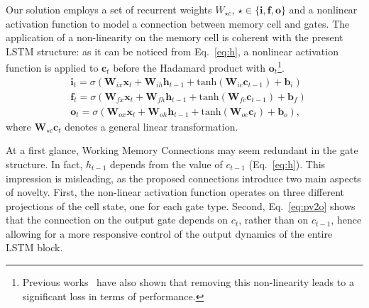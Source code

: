 Our solution employs a set of recurrent weights  $W_{\star c}$, $\star \in \{\mathbf{i}, \mathbf{f}, \mathbf{o}\}$ and a nonlinear activation function to model a connection between memory cell and gates. The application of a non-linearity on the memory cell is coherent with the present LSTM structure: as it can be noticed from Eq.~\ref{eq:h}, a nonlinear activation function is applied to $\mathbf{c}_t$ before the Hadamard product with $\mathbf{o}_t$\footnote{Previous works~\citep{Greff2017LSTMAS} have also shown that removing this non-linearity leads to a significant loss in terms of performance.}. 
\begin{align}
    &\mathbf{i}_t = \sigma
                    (\mathbf{W}_{ix}\mathbf{x}_{t} +
                    \mathbf{W}_{ih} \mathbf{h}_{t-1} +
                    \text{tanh}(\mathbf{W}_{ic} \mathbf{c}_{t-1}) +
                    \mathbf{b}_i) 
                    \label{eq:pv2i} \\
    &\mathbf{f}_t = \sigma
                    (\mathbf{W}_{fx}\mathbf{x}_{t} +
                    \mathbf{W}_{fh} \mathbf{h}_{t-1} +
                    \text{tanh}(\mathbf{W}_{fc} \mathbf{c}_{t-1}) +
                    \mathbf{b}_f) 
                    \label{eq:pv2f} \\
    &\mathbf{o}_t = \sigma
                    (\mathbf{W}_{ox}\mathbf{x}_{t} +
                    \mathbf{W}_{oh} \mathbf{h}_{t-1} +
                    \text{tanh}(\mathbf{W}_{oc} \mathbf{c}_{t}) +
                    \mathbf{b}_o),
                    \label{eq:pv2o}
\end{align}
where $\mathbf{W}_{\star c} \mathbf{c}_t$ denotes a general linear transformation.

At a first glance, Working Memory Connections may seem redundant in the gate structure. In fact, $h_{t-1}$ depends from the value of $c_{t-1}$ (Eq.~\ref{eq:h}). This impression is misleading, as the proposed connections introduce two main aspects of novelty. First, the non-linear activation function operates on three different projections of the cell state, one for each gate type. Second, Eq.~\ref{eq:pv2o} shows that the connection on the output gate depends on $c_t$, rather than on $c_{t-1}$, hence allowing for a more responsive control of the output dynamics of the entire LSTM block.

